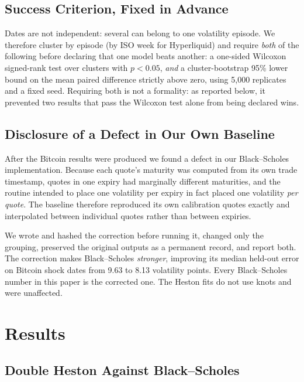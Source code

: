 \documentclass[runningheads]{llncs}
\begin{document}
\subsection{Success Criterion, Fixed in Advance}

Dates are not independent: several can belong to one volatility episode. We
therefore cluster by episode (by ISO week for Hyperliquid) and require
\emph{both} of the following before declaring that one model beats another:
a one-sided Wilcoxon signed-rank test over clusters with $p<0.05$, \emph{and} a
cluster-bootstrap 95\% lower bound on the mean paired difference strictly above
zero, using 5{,}000 replicates and a fixed seed. Requiring both is not a
formality: as reported below, it prevented two results that pass the Wilcoxon
test alone from being declared wins.

\subsection{Disclosure of a Defect in Our Own Baseline}

After the Bitcoin results were produced we found a defect in our
Black--Scholes implementation. Because each quote's maturity was computed from
its own trade timestamp, quotes in one expiry had marginally different
maturities, and the routine intended to place one volatility per expiry in fact
placed one volatility \emph{per quote}. The baseline therefore reproduced its
own calibration quotes exactly and interpolated between individual quotes
rather than between expiries.

We wrote and hashed the correction before running it, changed only the
grouping, preserved the original outputs as a permanent record, and report
both. The correction makes Black--Scholes \emph{stronger}, improving its median
held-out error on Bitcoin shock dates from 9.63 to 8.13 volatility points.
Every Black--Scholes number in this paper is the corrected one. The Heston fits
do not use knots and were unaffected.

\section{Results}

\subsection{Double Heston Against Black--Scholes}
\end{document}
